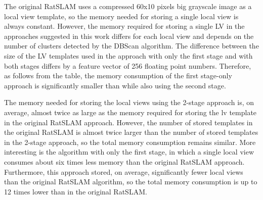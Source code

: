 The original RatSLAM uses a compressed 60x10 pixels big grayscale image as a local view template, so the memory needed for storing a single local view is always constant. However, the memory required for storing a single LV in the approaches suggested in this work differs for each local view and depends on the number of clusters detected by the DBScan algorithm. The difference between the size of the LV templates used in the approach with only the first stage and with both stages differs by a feature vector of 256 floating point numbers. Therefore, as follows from the table, the memory consumption of the first stage-only approach is significantly smaller than while also using the second stage.\par
The memory needed for storing the local views using the 2-stage approach is, on average, almost twice as large as the memory required for storing the lv template in the original RatSLAM approach. However, the number of stored templates in the original RatSLAM is almost twice larger than the number of stored templates in the 2-stage approach, so the total memory consumption remains similar. More interesting is the algorithm with only the first stage, in which a single local view consumes about six times less memory than the original RatSLAM approach. Furthermore, this approach stored, on average, significantly fewer local views than the original RatSLAM algorithm, so the total memory consumption is up to 12 times lower than in the original RatSLAM.
